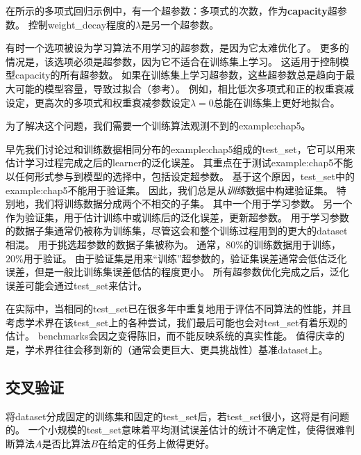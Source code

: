 在所示的多项式回归示例中，有一个超参数：多项式的次数，作为\textbf{\gls{capacity}}超参数。
控制\gls{weight_decay}程度的$\lambda$是另一个超参数。

有时一个选项被设为学习算法不用学习的超参数，是因为它太难优化了。
更多的情况是，该选项必须是超参数，因为它不适合在训练集上学习。
这适用于控制模型\gls{capacity}的所有超参数。
如果在训练集上学习超参数，这些超参数总是趋向于最大可能的模型容量，导致过拟合（参考）。
例如，相比低次多项式和正的权重衰减设定，更高次的多项式和权重衰减参数设定$\lambda=0$总能在训练集上更好地拟合。


为了解决这个问题，我们需要一个训练算法观测不到的\gls{example:chap5}。

早先我们讨论过和训练数据相同分布的\gls{example:chap5}组成的\gls{test_set}，它可以用来估计学习过程完成之后的\gls{learner}的泛化误差。
其重点在于测试\gls{example:chap5}不能以任何形式参与到模型的选择中，包括设定超参数。
基于这个原因，\gls{test_set}中的\gls{example:chap5}不能用于验证集。
因此，我们总是从\emph{训练}数据中构建验证集。
特别地，我们将训练数据分成两个不相交的子集。
其中一个用于学习参数。
另一个作为验证集，用于估计训练中或训练后的泛化误差，更新超参数。
用于学习参数的数据子集通常仍被称为训练集，尽管这会和整个训练过程用到的更大的\gls{dataset}相混。
用于挑选超参数的数据子集被称为。
通常，$80\%$的训练数据用于训练，$20\%$用于验证。
由于验证集是用来``训练''超参数的，验证集误差通常会低估泛化误差，但是一般比训练集误差低估的程度更小。
所有超参数优化完成之后，泛化误差可能会通过\gls{test_set}来估计。

在实际中，当相同的\gls{test_set}已在很多年中重复地用于评估不同算法的性能，并且考虑学术界在该\gls{test_set}上的各种尝试，我们最后可能也会对\gls{test_set}有着乐观的估计。
\gls{benchmarks}会因之变得陈旧，而不能反映系统的真实性能。
值得庆幸的是，学术界往往会移到新的（通常会更巨大、更具挑战性）基准\gls{dataset}上。

\subsection{交叉验证}
\label{sec:cross_validation}
将\gls{dataset}分成固定的训练集和固定的\gls{test_set}后，若\gls{test_set}很小，这将是有问题的。
一个小规模的\gls{test_set}意味着平均测试误差估计的统计不确定性，使得很难判断算法$A$是否比算法$B$在给定的任务上做得更好。


